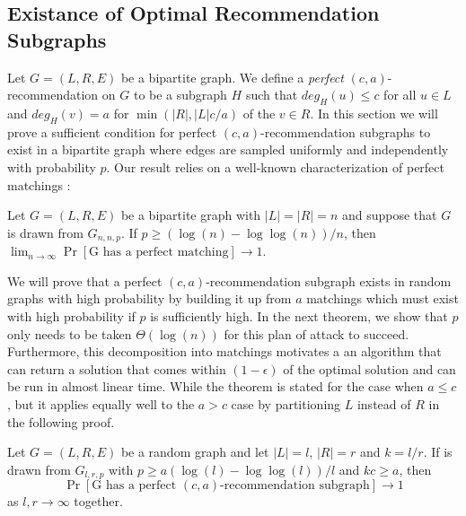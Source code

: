 \subsection{Existance of Optimal Recommendation Subgraphs}
Let $G=(L,R,E)$ be a bipartite graph. We define a \emph{perfect}
$(c,a)$-recommendation on $G$ to be a subgraph $H$ such that $deg_H(u)\leq c$
for all $u\in L$ and $deg_H(v)=a$ for $\min(|R|,|L|c/a)$ of the $v\in R$. In
this section we will prove a sufficient condition for perfect
$(c,a)$-recommendation subgraphs to exist in a bipartite graph where edges are
sampled uniformly and independently with probability $p$. Our result relies on a
well-known characterization of perfect matchings \cite{Janson2011}:

\begin{thm}
\label{random_matching_threshold}
Let $G=(L,R,E)$ be a bipartite graph with $|L| = |R| = n$ and suppose that $G$ is drawn from $G_{n,n,p}$. If $p \geq (\log(n) - \log\log(n))/n$, then $\lim_{n\to\infty}\Pr[\text{G has a perfect matching}] \to 1$.
\end{thm}

We will prove that a perfect $(c,a)$-recommendation subgraph exists in random
graphs with high probability by building it up from $a$ matchings which must
exist with high probability if $p$ is sufficiently high. In the next theorem, we
show that $p$ only needs to be taken $\Theta(\log(n))$ for this plan of attack
to succeed. Furthermore, this decomposition into matchings motivates a an
algorithm that can return a solution that comes within $(1-\epsilon)$ of the
optimal solution and can be run in almost linear time. While the theorem is
stated for the case when $a \leq c$, but it applies equally well to the $a > c$
case by partitioning $L$ instead of $R$ in the following proof.

\begin{thm}
Let $G=(L,R,E)$ be a random graph and let $|L|=l$, $|R|=r$ and $k=l/r$. If is drawn from $G_{l,r,p}$ with $p\geq a(\log(l)-\log\log(l))/l$ and $kc \geq a$, then 
\[ \Pr[\text{G has a perfect $(c,a)$-recommendation subgraph}] \to 1\]
as $l,r\to\infty$ together.
\end{thm}

